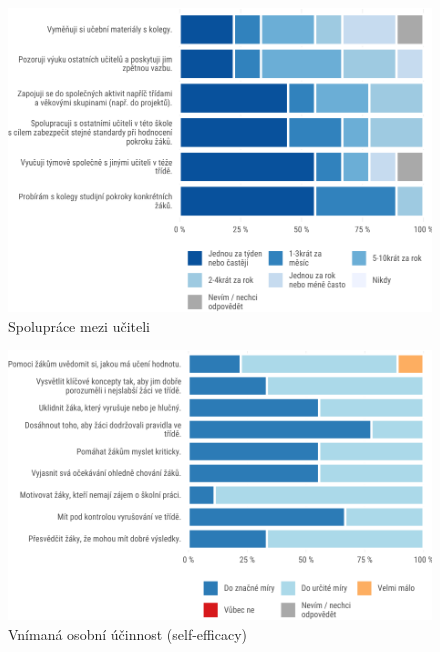 \documentclass[12pt,a4paper,]{report}
\begin{document}
\begin{figure}

{\centering \includegraphics[width=\textwidth]{figs/tots2q1T3COOPappdx-1}

}

\caption{Spolupráce mezi učiteli}\label{fig:tots2q1T3COOPappdx}
\end{figure}

\begin{figure}

{\centering \includegraphics[width=\textwidth]{figs/tots2q2T3SELFappdx-1}

}

\caption{Vnímaná osobní účinnost (self-efficacy)}\label{fig:tots2q2T3SELFappdx}
\end{figure}
\end{document}
